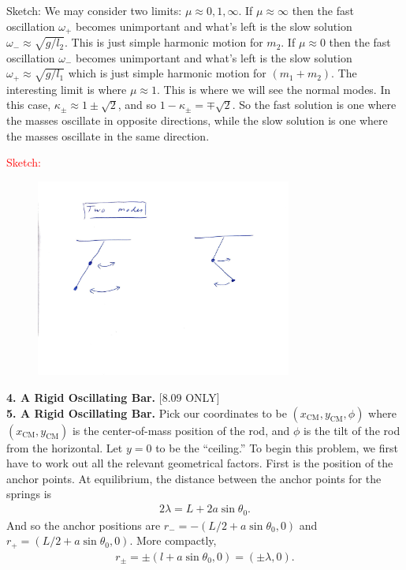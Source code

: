 \documentclass{article}
\theoremstyle{definition}
\begin{document}
\begin{enumerate}[label=(\alph*)]
	Sketch: We may consider two limits: $\mu \approx 0,1,\infty$. If $\mu \approx \infty$ then the fast oscillation $\omega_+$ becomes unimportant and what's left is the slow solution $\omega_- \approx \sqrt{g/l_2}$. This is just simple harmonic motion for $m_2$. If $\mu \approx 0$ then the fast oscillation $\omega_-$ becomes unimportant and what's left is the slow solution $\omega_+ \approx \sqrt{g/l_1}$ which is just simple harmonic motion for $(m_1+m_2)$. The interesting limit is where $\mu \approx 1$. This is where we will see the normal modes. In this case, $\kappa_\pm \approx 1\pm\sqrt{2}$, and so $1-\kappa_\pm = \mp \sqrt{2}$. So the fast solution is one where the masses oscillate in opposite directions, while the slow solution is one where the masses oscillate in the  same direction. 
	
	\textcolor{red}{Sketch:}
	\begin{figure}[!htb]
		\centering
		\includegraphics[width=0.75\textwidth]{modes2}
	\end{figure}
	
\end{enumerate}

\newpage

\noindent \textbf{4. A Rigid Oscillating Bar.} [8.09 ONLY] \\


\noindent \textbf{5. A Rigid Oscillating Bar.} Pick our coordinates to be $(x_\text{CM}, y_\text{CM}, \phi)$ where $(x_\text{CM},y_\text{CM})$ is the center-of-mass position of the rod, and $\phi$ is the tilt of the rod from the horizontal. Let $y=0$ to be the ``ceiling.'' To begin this problem, we first have to work out all the relevant geometrical factors. First is the position of the anchor points. At equilibrium, the distance between the anchor points for the springs is 
\begin{align*}
2\lambda = L +2 a\sin\theta_0. 
\end{align*}
And so the anchor positions are $r_- = -(L/2 + a\sin\theta_0,0)$ and $r_+ = (L/2+a\sin\theta_0,0)$. More compactly, 
\begin{align*}
r_\pm = \pm (l+a\sin\theta_0,0) = (\pm \lambda,0).
\end{align*}
\end{document}
